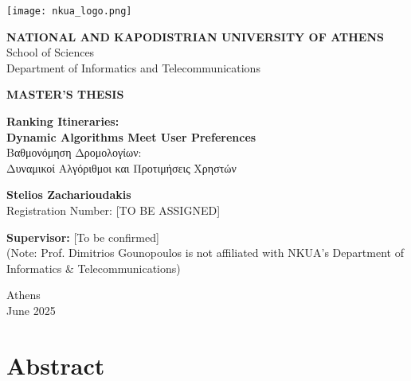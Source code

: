 \documentclass[12pt,a4paper,twoside]{report}
\theoremstyle{definition}
\begin{document}
\begin{titlepage}
    \centering
    \texttt{[image: nkua\_logo.png]} %
    
    \vspace{1cm}
    
    {\Large \textbf{NATIONAL AND KAPODISTRIAN UNIVERSITY OF ATHENS}}\\
    \vspace{0.5cm}
    {\large School of Sciences\\
    Department of Informatics and Telecommunications}\\
    \vspace{2cm}
    
    {\Large \textbf{MASTER'S THESIS}}\\
    \vspace{2cm}
    
    {\huge \textbf{Ranking Itineraries:\\Dynamic Algorithms Meet User Preferences}}\\
    \vspace{1cm}
    {\Large \textgreek{Βαθμονόμηση Δρομολογίων:\\Δυναμικοί Αλγόριθμοι και Προτιμήσεις Χρηστών}}\\
    
    \vspace{2cm}
    
    {\Large \textbf{Stelios Zacharioudakis}}\\
    \vspace{0.5cm}
    {\large Registration Number: [TO BE ASSIGNED]}\\
    
    \vspace{3cm}
    
    {\large \textbf{Supervisor:} [To be confirmed]}\\
    {\small (Note: Prof. Dimitrios Gounopoulos is not affiliated with NKUA's Department of Informatics \& Telecommunications)}\\
    
    \vspace{2cm}
    
    {\large Athens\\
    June 2025}
\end{titlepage}

\newpage
\thispagestyle{empty}
\section*{Abstract}
\end{document}
